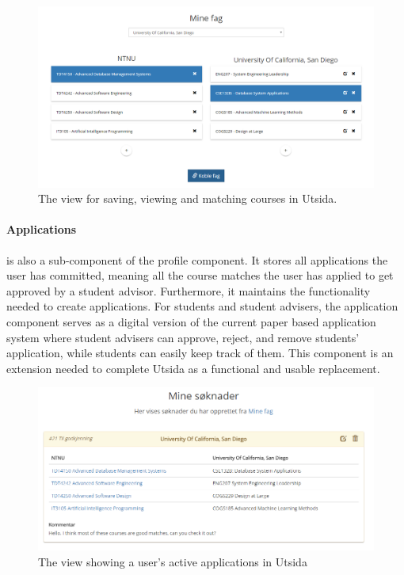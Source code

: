 \begin{figure}[h]
    \centering
    \includegraphics[width=1\textwidth]{fig/utsida_screenshots/course_match.png}
    \caption{The view for saving, viewing and matching courses in Utsida.}
    \label{fig:my_label}
\end{figure}

\paragraph{Applications} is also a sub-component of the profile component. It stores all applications the user has committed, meaning all the course matches the user has applied to get approved by a student advisor. Furthermore, it maintains the functionality needed to create applications. For students and student advisers, the application component serves as a digital version of the current paper based application system where student advisers can approve, reject, and remove students' application, while students can easily keep track of them. This component is an extension needed to complete Utsida as a functional and usable replacement.

\begin{figure}[H]
    \centering
    \includegraphics[width=1\textwidth]{fig/utsida_screenshots/application_list.PNG}
    \caption{The view showing a user's active applications in Utsida}
    \label{fig:my_label}
\end{figure}

